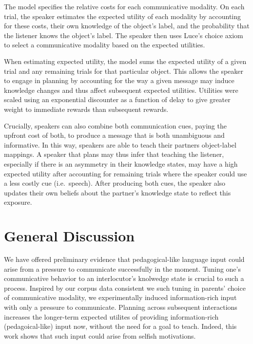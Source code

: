 \documentclass[10pt, letterpaper]{article}
\begin{document}
The model specifies the relative costs for each communicative modality.
On each trial, the speaker estimates the expected utility of each
modality by accounting for these costs, their own knowledge of the
object's label, and the probability that the listener knows the object's
label. The speaker then uses Luce's choice axiom to select a
communicative modality based on the expected utilities.

When estimating expected utility, the model sums the expected utility of
a given trial and any remaining trials for that particular object. This
allows the speaker to engage in planning by accounting for the way a
given message may induce knowledge changes and thus affect subsequent
expected utilities. Utilities were scaled using an exponential
discounter as a function of delay to give greater weight to immediate
rewards than subsequent rewards.

Crucially, speakers can also combine both communication cues, paying the
upfront cost of both, to produce a message that is both unambiguous and
informative. In this way, speakers are able to teach their partners
object-label mappings. A speaker that plans may thus infer that teaching
the listener, especially if there is an asymmetry in their knowledge
states, may have a high expected utility after accounting for remaining
trials where the speaker could use a less costly cue (i.e.~speech).
After producing both cues, the speaker also updates their own beliefs
about the partner's knowledge state to reflect this exposure.

\section{General Discussion}\label{general-discussion}

We have offered preliminary evidence that pedagogical-like language
input could arise from a pressure to communicate successfully in the
moment. Tuning one's communicative behavior to an interlocutor's
knolwedge state is crucial to such a process. Inspired by our corpus
data consistent we such tuning in parents' choice of communicative
modality, we experimentally induced information-rich input with only a
pressure to communicate. Planning across subsequent interactions
increases the longer-term expected utilites of providing
information-rich (pedagoical-like) input now, without the need for a
goal to teach. Indeed, this work shows that such input could arise from
selfish motivations.
\end{document}
